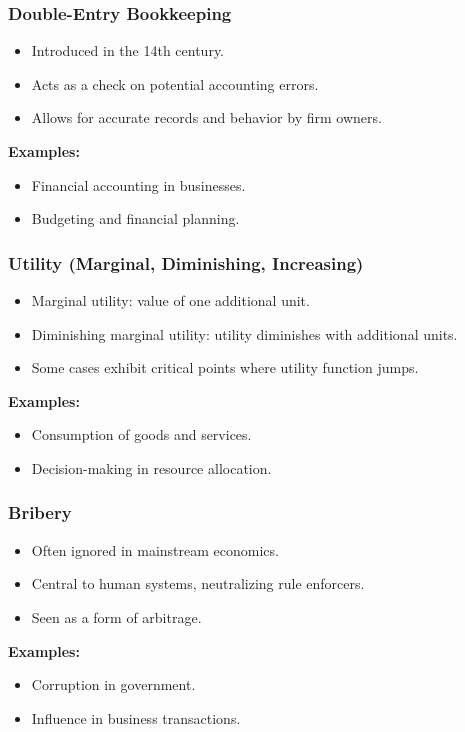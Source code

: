 \begin{frame}[fragile]\frametitle{Double-Entry Bookkeeping}
\begin{itemize}
    \item Introduced in the 14th century.
    \item Acts as a check on potential accounting errors.
    \item Allows for accurate records and behavior by firm owners.
\end{itemize}
\textbf{Examples:}
\begin{itemize}
    \item Financial accounting in businesses.
    \item Budgeting and financial planning.
\end{itemize}
\end{frame}

\begin{frame}[fragile]\frametitle{Utility (Marginal, Diminishing, Increasing)}
\begin{itemize}
    \item Marginal utility: value of one additional unit.
    \item Diminishing marginal utility: utility diminishes with additional units.
    \item Some cases exhibit critical points where utility function jumps.
\end{itemize}
\textbf{Examples:}
\begin{itemize}
    \item Consumption of goods and services.
    \item Decision-making in resource allocation.
\end{itemize}
\end{frame}

\begin{frame}[fragile]\frametitle{Bribery}
\begin{itemize}
    \item Often ignored in mainstream economics.
    \item Central to human systems, neutralizing rule enforcers.
    \item Seen as a form of arbitrage.
\end{itemize}
\textbf{Examples:}
\begin{itemize}
    \item Corruption in government.
    \item Influence in business transactions.
\end{itemize}
\end{frame}

